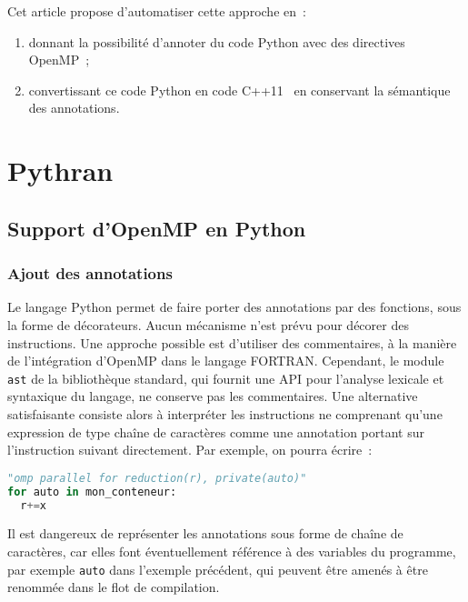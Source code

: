\documentclass[renpar]{compas2013}
\begin{document}
Cet article propose d'automatiser cette approche en~:
\begin{enumerate}
  \item donnant la possibilité d'annoter du code Python avec des
	directives OpenMP~\cite{openmp3.1};
  \item convertissant ce code Python en code C++11~\cite{isocxx11} en conservant la
	sémantique des annotations.
\end{enumerate}


\section{Pythran}\label{sec:pythran}

\subsection{Support d'OpenMP en Python}
\label{sec:python-openmp}

\subsubsection{Ajout des annotations}

Le langage Python permet de faire porter des annotations par des
fonctions, sous la forme de décorateurs. Aucun mécanisme n'est prévu pour
décorer des instructions. Une approche possible est d'utiliser des
commentaires, à la manière de l'intégration d'OpenMP dans le langage
FORTRAN. Cependant, le module \texttt{ast} de la bibliothèque standard,
qui fournit une API pour l'analyse lexicale et syntaxique du langage, ne
conserve pas les commentaires. Une alternative satisfaisante consiste
alors à interpréter les instructions ne comprenant qu'une expression de type
chaîne de caractères comme une annotation portant sur l'instruction
suivant directement. Par exemple, on pourra écrire~:

\begin{lstlisting}[language=python]
"omp parallel for reduction(r), private(auto)"
for auto in mon_conteneur:
  r+=x
\end{lstlisting}

Il est dangereux de représenter les annotations sous forme de chaîne de
caractères, car elles font éventuellement référence à des variables du
programme, par exemple \texttt{auto} dans l'exemple précédent, qui peuvent
être amenés à être renommée dans le flot de compilation.
\end{document}
